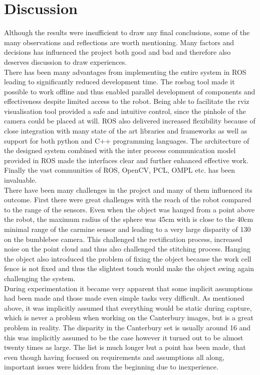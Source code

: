 \chapter{Discussion}
Although the results were insufficient to draw any final conclusions, some of the many observations and reflections are worth mentioning. Many factors and decisions has influenced the project both good and bad and therefore also deserves discussion to draw experiences.\\

There has been many advantages from implementing the entire system in ROS leading to significantly reduced development time. The rosbag tool made it possible to work offline and thus enabled parallel development of components and effectiveness despite limited access to the robot. Being able to facilitate the rviz visualisation tool provided a safe and intuitive control, since the pinhole of the camera could be placed at will. ROS also delivered increased flexibility because of close integration with many state of the art libraries and frameworks as well as support for both python and C++ programming languages. The architecture of the designed system combined with the inter process communication model provided in ROS made the interfaces clear and further enhanced effective work. Finally the vast communities of ROS, OpenCV, PCL, OMPL etc. has been invaluable.\\

There have been many challenges in the project and many of them influenced its outcome. First there were great challenges with the reach of the robot compared to the range of the sensors. Even when the object was hanged from a point above the robot, the maximum radius of the sphere was 45cm with is close to the 40cm minimal range of the carmine sensor and leading to a very large disparity of 130 on the bumblebee camera. This challenged the rectification process, increased noise on the point cloud and thus also challenged the stitching process. Hanging the object also introduced the problem of fixing the object because the work cell fence is not fixed and thus the slightest touch would make the object swing again challenging the system.\\

During experimentation it became very apparent that some implicit assumptions had been made and those made even simple tasks very difficult. As mentioned above, it was implicitly assumed that everything would be static during capture, which is never a problem when working on the Canterbury images, but is a great problem in reality. The disparity in the Canterbury set is usually around 16 and this was implicitly assumed to be the case however it turned out to be almost twenty times as large. The list is much longer but a point has been made, that even though having focused on requirements and assumptions all along, important issues were hidden from the beginning due to inexperience.\\

